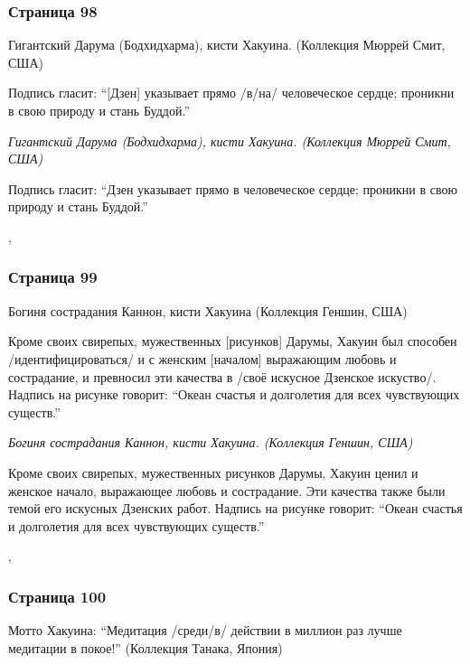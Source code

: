 \subsubsection{Страница 98}
\begin{ver}
Гигантский Дарума (Бодхидхарма), кисти Хакуина. (Коллекция Мюррей Смит,
США)

Подпись гласит: ``[Дзен] указывает прямо /в/на/ человеческое сердце;
проникни в свою природу и стань Буддой.''
\end{ver}

\begin{ver}[1]\it
Гигантский Дарума (Бодхидхарма), кисти Хакуина. (Коллекция Мюррей Смит,
США)
\end{ver}

\begin{ver}[1]
Подпись гласит: ``Дзен указывает прямо в человеческое сердце;
проникни в свою природу и стань Буддой.''
\end{ver}
\sep

\subsubsection{Страница 99}
\begin{ver}
Богиня сострадания Каннон, кисти Хакуина (Коллекция Геншин, США)

Кроме своих свирепых, мужественных [рисунков] Дарумы, Хакуин был
способен /идентифицироваться/ и с женским [началом] выражающим любовь
и сострадание, и превносил эти качества в /своё искусное Дзенское
искуство/.
Надпись на рисунке говорит: ``Океан счастья и долголетия для всех
чувствующих существ.''
\end{ver}

\begin{ver}[1]\it
Богиня сострадания Каннон, кисти Хакуина. (Коллекция Геншин, США)
\end{ver}

\begin{ver}[1]
Кроме своих свирепых, мужественных рисунков Дарумы, Хакуин ценил и
женское начало, выражающее любовь и сострадание. Эти качества также
были темой его искусных Дзенских работ.
Надпись на рисунке говорит: ``Океан счастья и долголетия для всех
чувствующих существ.''
\end{ver}
\sep
 
\subsubsection{Страница 100}
\begin{ver}
Мотто Хакуина: ``Медитация /среди/в/ действии в миллион раз лучше
медитации в покое!'' (Коллекция Танака, Япония)
\end{ver}

